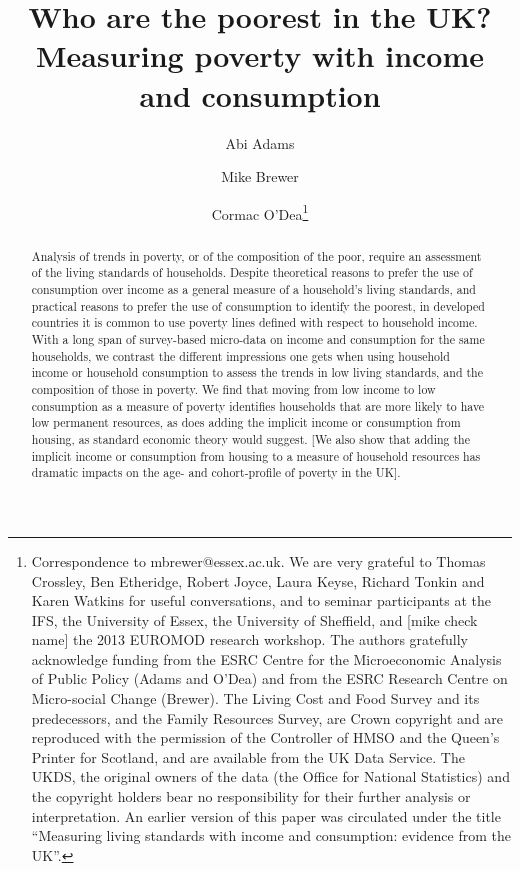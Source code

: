 \documentclass[11pt]{article} %
\title{Who are the poorest in the UK? Measuring poverty with income and consumption}
\author[1]{Abi Adams}
\author[2]{Mike Brewer}
\author[3]{Cormac O'Dea\thanks{Correspondence to mbrewer@essex.ac.uk. We are very grateful to Thomas Crossley, Ben Etheridge, Robert Joyce, Laura Keyse, Richard Tonkin and Karen Watkins for useful conversations, and to seminar participants at the IFS, the University of Essex, the University of Sheffield, and [mike check name] the 2013 EUROMOD research workshop. The authors gratefully acknowledge funding from the ESRC Centre for the Microeconomic Analysis of Public Policy (Adams and O'Dea) and from the ESRC Research Centre on Micro-social Change (Brewer). The Living Cost and Food Survey and its predecessors, and the Family Resources Survey, are Crown copyright and are reproduced with the permission of the Controller of HMSO and the Queen's Printer for Scotland, and are available from the UK Data Service. The UKDS, the original owners of the data (the Office for National Statistics) and the copyright holders bear no responsibility for their further analysis or interpretation. An earlier version of this paper was circulated under the title ``Measuring living standards with income and consumption: evidence from the UK''.}
}
\affil[1]{Yale University and Institute for Fiscal Studies}
\affil[2]{University of Essex and Institute for Fiscal Studies}
\affil[3]{Institute for Fiscal Studies}
\begin{document}
\maketitle

\begin{abstract}
%
Analysis of trends in poverty, or of the composition of the poor, require an assessment of the living standards of households. Despite theoretical reasons to prefer the use of consumption over income as a general measure of a household's living standards, and practical reasons to prefer the use of consumption to identify the poorest, in developed countries it is common to use poverty lines defined with respect to household income. With a long span of survey-based micro-data on income and consumption for the same households, we contrast the different impressions one gets when using household income or household consumption to assess the trends in low living standards, and the composition of those in poverty. We find that moving from low income to low consumption as a measure of poverty identifies households that are more likely to have low permanent resources, as does adding the implicit income or consumption from housing, as standard economic theory would suggest. [We also show that adding the implicit income or consumption from housing to a measure of household resources has dramatic impacts on the age- and cohort-profile of poverty in the UK]. \end{abstract}





%



\newpage
%


\newpage
\appendix


%
\end{document}
